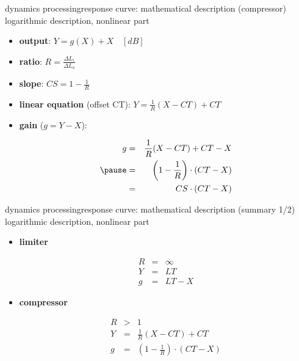 \begin{frame}{dynamics processing}{response curve: mathematical description (compressor)}
	\vspace{-2mm}
    logarithmic description, nonlinear part
    \bigskip
	\begin{itemize}
		\item	 \textbf{output}:
			$Y = g(X) + X\quad [\unit{dB}]$
		\pause
		\item	\textbf{ratio}:
			$R = \frac{\Delta L_i}{\Delta L_o}$
		\pause
		\item	\textbf{slope}:
			$CS = 1-\frac{1}{R}$
		\pause
		\item	\textbf{linear equation} (offset CT):
			$Y = \frac{1}{R}\left(X-CT\right) + CT$
		\pause
		\item	\textbf{gain} ($g = Y-X$):
			\begin{footnotesize}\begin{eqnarray*}
				g &=& \frac{1}{R}(X-CT) + CT - X\\
				\pause
				  &=& \left(1-\frac{1}{R}\right)\cdot (CT-X)\\
                  &=& CS\cdot(CT-X)
			\end{eqnarray*}\end{footnotesize}
	\end{itemize}
\end{frame}
\begin{frame}{dynamics processing}{response curve: mathematical description (summary 1/2)}
	\vspace{-2mm}
    logarithmic description, nonlinear part
    \bigskip
	\begin{itemize}
		\item	\textbf{limiter}
			\begin{footnotesize}\begin{eqnarray*}
				R &=& \infty\\
				Y &=& LT\\
				g &=& LT-X
			\end{eqnarray*}\end{footnotesize}
		\pause
		\item	\textbf{compressor}
			\begin{footnotesize}\begin{eqnarray*}
				R &>& 1\\
				Y &=& \frac{1}{R}\left(X-CT\right) + CT\\
				g &=& \left(1-\frac{1}{R}\right)\cdot (CT-X)
			\end{eqnarray*}\end{footnotesize}
	\end{itemize}
\end{frame}
